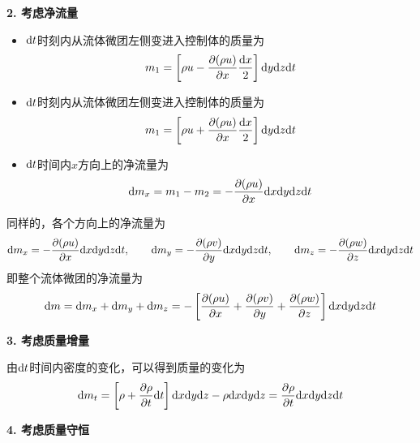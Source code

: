 \noindent \textbf{2. 考虑净流量}
\begin{itemize}
	\item ${\rm{d}} t$时刻内从流体微团左侧变进入控制体的质量为
	\begin{equation*}
		m_1 = \left[\rho u - \dfrac{\partial (\rho u)}{\partial x} \dfrac{{\rm{d}} x}{2}\right]{\rm{d}} y {\rm{d}} z {\rm{d}} t
	\end{equation*}

		\item ${\rm{d}} t$时刻内从流体微团左侧变进入控制体的质量为
	\begin{equation*}
		m_1 = \left[\rho u + \dfrac{\partial (\rho u)}{\partial x} \dfrac{{\rm{d}} x}{2}\right]{\rm{d}} y {\rm{d}} z {\rm{d}} t
	\end{equation*}
	
	\item ${\rm{d}} t$时间内$x$方向上的净流量为
	\begin{equation*}
		{\rm{d}} m_x = m_1 - m_2 = - \dfrac{\partial (\rho u)}{\partial x} {\rm{d}} x{\rm{d}} y {\rm{d}} z {\rm{d}} t
	\end{equation*}
\end{itemize}
同样的，各个方向上的净流量为
\begin{equation}
	{\rm{d}} m_x = - \dfrac{\partial (\rho u)}{\partial x} {\rm{d}} x{\rm{d}} y {\rm{d}} z {\rm{d}} t, \qquad 
	{\rm{d}} m_y = - \dfrac{\partial (\rho v)}{\partial y} {\rm{d}} x{\rm{d}} y {\rm{d}} z {\rm{d}} t, \qquad 
	{\rm{d}} m_z = - \dfrac{\partial (\rho w)}{\partial z} {\rm{d}} x{\rm{d}} y {\rm{d}} z {\rm{d}} t
\end{equation}
即整个流体微团的净流量为
\begin{equation}
	{\rm{d}} m = {\rm{d}} m_x + {\rm{d}} m_y + {\rm{d}} m_z = - \left[\dfrac{\partial (\rho u)}{\partial x} +  \dfrac{\partial (\rho v)}{\partial y} +  \dfrac{\partial (\rho w)}{\partial z} \right] {\rm{d}} x {\rm{d}} y {\rm{d}} z {\rm{d}} t
\end{equation}
\vspace*{0.5em}

\noindent \textbf{3. 考虑质量增量}

由${\rm{d}} t$时间内密度的变化，可以得到质量的变化为
\begin{equation}
	{\rm{d}} m_t = \left[\rho + \dfrac{\partial \rho}{\partial t}{\rm{d}} t\right]{\rm{d}} x {\rm{d}} y {\rm{d}} z - \rho {\rm{d}} x {\rm{d}} y {\rm{d}} z = \dfrac{\partial \rho}{\partial t}{\rm{d}} x {\rm{d}} y {\rm{d}} z{\rm{d}} t
\end{equation}

\noindent \textbf{4. 考虑质量守恒}
 
